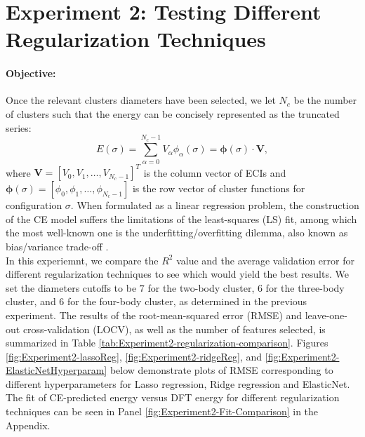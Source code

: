\documentclass{article}
\let\citep\parencite   %
\begin{document}
\section{Experiment 2: Testing Different Regularization Techniques}
\label{sec:Experiment2}
\paragraph{Objective:}
Once the relevant clusters diameters have been selected, we let $N_c$ be the number of clusters such that the energy can be concisely represented as the truncated series:
\begin{equation}
    E(\sigma) = \sum_{\alpha=0}^{N_c-1} V_{\alpha} \phi_{\alpha}(\sigma) = \boldsymbol{\phi}(\sigma) \cdot \mathbf{V},
\end{equation}
where $\mathbf{V} = [V_0, V_1, \dots, V_{N_c-1}]^T$ is the column vector of ECIs and $\boldsymbol{\phi}(\sigma) = [\phi_0, \phi_1, \dots, \phi_{N_c-1}]$ is the row vector of cluster functions for configuration $\sigma$.  When formulated as a linear regression problem, the construction of the CE model suffers the limitations of the least-squares (LS) fit, among which the most well-known one is the underfitting/overfitting dilemma, also known as bias/variance trade-off \citep{Variance-Bias}. \\
In this experiemnt, we compare the $R^2$ value and the average validation error for different regularization techniques to see which would yield the best results. We set the diameters cutoffs to be $7$ for the two-body cluster, $6$ for the three-body cluster, and $6$ for the four-body cluster, as determined in the previous experiment. The results of the root-mean-squared error (RMSE) and leave-one-out cross-validation (LOCV), as well as the number of features selected, is summarized in Table \ref{tab:Experiment2-regularization-comparison}. Figures \ref{fig:Experiment2-lassoReg}, \ref{fig:Experiment2-ridgeReg}, and \ref{fig:Experiment2-ElasticNetHyperparam} below demonstrate plots of RMSE corresponding to different hyperparameters for Lasso regression, Ridge regression and ElasticNet. The fit of CE-predicted energy versus DFT energy for different regularization techniques can be seen in Panel \ref{fig:Experiment2-Fit-Comparison} in the Appendix.
\end{document}
